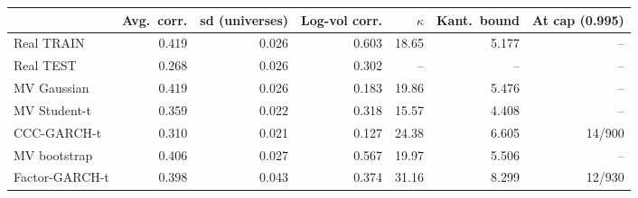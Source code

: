 \begin{tabular}{lrrrrrr}
\toprule
 & Avg.\ corr. & sd (universes) & Log-vol corr. & $\kappa$ & Kant.\ bound & At cap (0.995) \\
\midrule
Real TRAIN & 0.419 & 0.026 & 0.603 & 18.65 & 5.177 & -- \\
Real TEST & 0.268 & 0.026 & 0.302 & -- & -- & -- \\
MV Gaussian & 0.419 & 0.026 & 0.183 & 19.86 & 5.476 & -- \\
MV Student-t & 0.359 & 0.022 & 0.318 & 15.57 & 4.408 & -- \\
CCC-GARCH-t & 0.310 & 0.021 & 0.127 & 24.38 & 6.605 & 14/900 \\
MV bootstrap & 0.406 & 0.027 & 0.567 & 19.97 & 5.506 & -- \\
Factor-GARCH-t & 0.398 & 0.043 & 0.374 & 31.16 & 8.299 & 12/930 \\
\bottomrule
\end{tabular}

